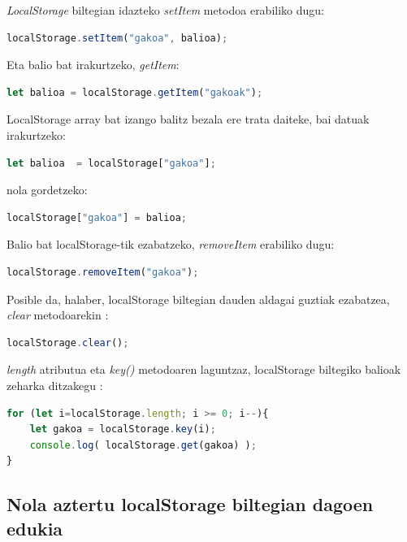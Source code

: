 \textit{LocalStorage} biltegian idazteko \textit{setItem}  metodoa erabiliko dugu:

\begin{lstlisting}[language=javascript,numbers=none]
localStorage.setItem("gakoa", balioa);
\end{lstlisting}

Eta balio bat irakurtzeko, \textit{getItem}:
\begin{lstlisting}[language=javascript,numbers=none]
let balioa = localStorage.getItem("gakoak");
\end{lstlisting}
 
LocalStorage array bat izango balitz bezala ere trata daiteke, bai datuak irakurtzeko:

\begin{lstlisting}[language=javascript,numbers=none]
let balioa  = localStorage["gakoa"];
\end{lstlisting}

nola gordetzeko:

\begin{lstlisting}[language=javascript,numbers=none]
localStorage["gakoa"] = balioa;
\end{lstlisting}

Balio bat localStorage-tik ezabatzeko, \textit{removeItem}   erabiliko dugu:

\begin{lstlisting}[language=javascript,numbers=none]
localStorage.removeItem("gakoa");
\end{lstlisting}


Posible da, halaber, localStorage biltegian dauden aldagai guztiak ezabatzea, \textit{clear} metodoarekin :

\begin{lstlisting}[language=javascript,numbers=none]
localStorage.clear();
\end{lstlisting}

\textit{length} atributua eta \textit{key()} metodoaren laguntzaz, localStorage biltegiko balioak zeharka ditzakegu :

\begin{lstlisting}[language=javascript,numbers=none]
for (let i=localStorage.length; i >= 0; i--){
    let gakoa = localStorage.key(i);
    console.log( localStorage.get(gakoa) );
}
\end{lstlisting}

\subsection{Nola aztertu localStorage biltegian dagoen edukia}

